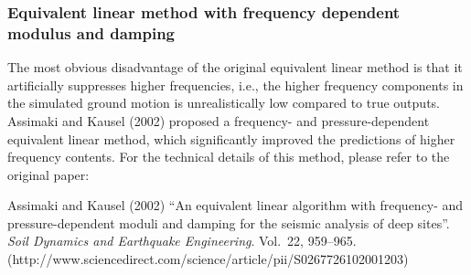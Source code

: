 \documentclass[11pt,letterpaper]{article}
\begin{document}


\subsubsection{Equivalent linear method with frequency dependent modulus and damping}

The most obvious disadvantage of the original equivalent linear method is that it artificially suppresses higher frequencies, i.e., the higher frequency components in the simulated ground motion is unrealistically low compared to true outputs. Assimaki and Kausel (2002) proposed a frequency- and pressure-dependent equivalent linear method, which significantly improved the predictions of higher frequency contents. For the technical details of this method, please refer to the original paper:

Assimaki and Kausel (2002) ``An equivalent linear algorithm with frequency- and pressure-dependent moduli and damping for the seismic analysis of deep sites''. \emph{Soil Dynamics and Earthquake Engineering}. Vol.~22, 959--965. (http://www.sciencedirect.com/science/article/pii/S0267726102001203)
\end{document}
